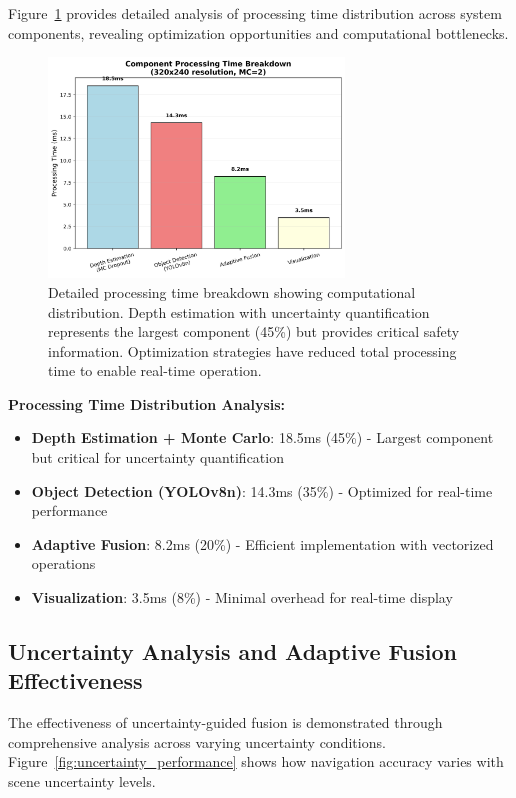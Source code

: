 \documentclass[12pt,oneside]{book}
\newcommand{\figref}[1]{Figure~\ref{#1}}
\begin{document}
\figref{fig:detailed_timing} provides detailed analysis of processing time distribution across system components, revealing optimization opportunities and computational bottlenecks.

\begin{figure}[ht]
\centering
\includegraphics[width=0.7\textwidth]{timing_breakdown.png}
\caption{Detailed processing time breakdown showing computational distribution. Depth estimation with uncertainty quantification represents the largest component (45\%) but provides critical safety information. Optimization strategies have reduced total processing time to enable real-time operation.}
\label{fig:detailed_timing}
\end{figure}

\textbf{Processing Time Distribution Analysis:}
\begin{itemize}
\item \textbf{Depth Estimation + Monte Carlo}: 18.5ms (45\%) - Largest component but critical for uncertainty quantification
\item \textbf{Object Detection (YOLOv8n)}: 14.3ms (35\%) - Optimized for real-time performance
\item \textbf{Adaptive Fusion}: 8.2ms (20\%) - Efficient implementation with vectorized operations
\item \textbf{Visualization}: 3.5ms (8\%) - Minimal overhead for real-time display
\end{itemize}

\subsection{Uncertainty Analysis and Adaptive Fusion Effectiveness}

The effectiveness of uncertainty-guided fusion is demonstrated through comprehensive analysis across varying uncertainty conditions. \figref{fig:uncertainty_performance} shows how navigation accuracy varies with scene uncertainty levels.
\end{document}
